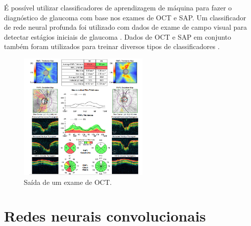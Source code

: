 \documentclass[conference]{IEEEtran}
\begin{document}
É possível utilizar classificadores de aprendizagem de máquina para fazer o diagnóstico de glaucoma com base nos exames de OCT e SAP. Um classificador de rede neural profunda foi utilizado com dados de exame de campo visual para detectar estágios iniciais de glaucoma \cite{Asaoka2016}. Dados de OCT e SAP em conjunto também foram utilizados para treinar diversos tipos de classificadores \cite{Populacoes2009,bowd2008}. %


\begin{figure}[!tp]
  \centering
  \includegraphics[width=2.5in]{img/oct.png}
  \caption{Saída de um exame de OCT.}
  \label{fig:oct}
\end{figure}

\section{Redes neurais convolucionais}
\end{document}
